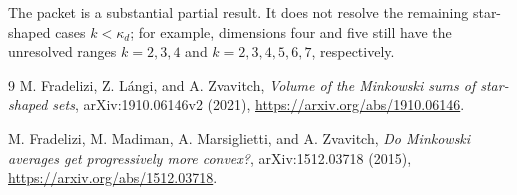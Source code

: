 \documentclass[11pt]{article}
\begin{document}
The packet is a substantial partial result.  It does not resolve the remaining
star-shaped cases $k<\kappa_d$; for example, dimensions four and five still
have the unresolved ranges $k=2,3,4$ and $k=2,3,4,5,6,7$, respectively.

\begin{thebibliography}{9}
M. Fradelizi, Z. L\'angi, and A. Zvavitch,
\emph{Volume of the Minkowski sums of star-shaped sets},
arXiv:1910.06146v2 (2021),
\url{https://arxiv.org/abs/1910.06146}.

M. Fradelizi, M. Madiman, A. Marsiglietti, and A. Zvavitch,
\emph{Do Minkowski averages get progressively more convex?},
arXiv:1512.03718 (2015),
\url{https://arxiv.org/abs/1512.03718}.
\end{thebibliography}
\end{document}
